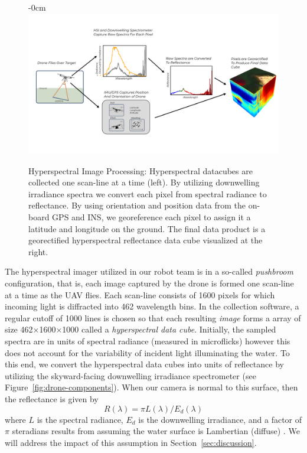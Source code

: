 \documentclass[journal,article,submit,pdftex,moreauthors]{Definitions/mdpi}
\begin{document}
\begin{figure}[H]
\begin{adjustwidth}{-\extralength}{0cm}
\centering
\includegraphics[width=16cm]{paper/figures/materials-and-methods/pipeline-figure-2.pdf}
\end{adjustwidth}
\caption{Hyperspectral Image Processing: Hyperspectral datacubes are collected one scan-line at a time (left). By utilizing downwelling irradiance spectra we convert each pixel from spectral radiance to reflectance. By using orientation and position data from the on-board GPS and INS, we georeference each pixel to assign it a latitude and longitude on the ground. The final data product is a georectified hyperspectral reflectance data cube visualized at the right. \label{fig:hsi-pipeline}}
\end{figure}  

The hyperspectral imager utilized in our robot team is in a so-called \textit{pushbroom} configuration, that is, each image captured by the drone is formed one scan-line at a time as the UAV flies. Each scan-line consists of 1600 pixels for which incoming light is diffracted into 462 wavelength bins. In the collection software, a regular cutoff of 1000 lines is chosen so that each resulting \textit{image} forms a array of size 462$\times$1600$\times$1000 called a \textit{hyperspectral data cube}. Initially, the sampled spectra are in units of spectral radiance (measured in microflicks) however this does not account for the variability of incident light illuminating the water. To this end, we convert the hyperspectral data cubes into units of reflectance by utilizing the skyward-facing downwelling irradiance spectrometer (see Figure~\ref{fig:drone-components}). When our camera is normal to this surface, then the reflectance is given by
\begin{equation}
    R(\lambda) = \pi L(\lambda)/E_d(\lambda)
\end{equation}
where $L$ is the spectral radiance, $E_d$ is the downwelling irradiance, and a factor of $\pi$ steradians results from assuming the water surface is Lambertian (diffuse) \cite{reflectance-conversion}. We will address the impact of this assumption in Section~\ref{sec:discussion}.
\end{document}
